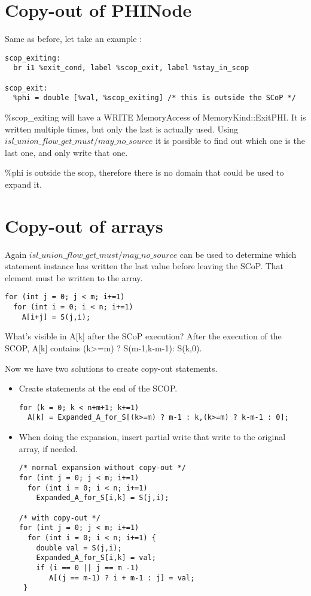 \section{Copy-out of PHINode}
Same as before, let take an example :
\begin{lstlisting}[frame=single]
scop_exiting:
  br i1 %exit_cond, label %scop_exit, label %stay_in_scop

scop_exit:
  %phi = double [%val, %scop_exiting] /* this is outside the SCoP */
\end{lstlisting}

\%scop\_exiting will have a WRITE MemoryAccess of MemoryKind::ExitPHI. It is written multiple times, but only the last is actually used. Using $isl\_union\_flow\_get\_{must/may}\_no\_source$ it is possible to find out which one is the last one, and only write that one.

\%phi is outside the scop, therefore there is no domain that could be used to expand it.

\section{Copy-out of arrays}

Again $isl\_union\_flow\_get\_{must/may}\_no\_source$ can be used to determine which statement instance has written the last value before leaving the SCoP. That element must be written to the array.

\begin{lstlisting}[frame=single]
for (int j = 0; j < m; i+=1)
  for (int i = 0; i < n; i+=1)
    A[i+j] = S(j,i);
\end{lstlisting}

What's visible in A[k] after the SCoP execution? After the execution of the SCOP, A[k] contains (k>=m) ? S(m-1,k-m-1): S(k,0).

Now we have two solutions to create copy-out statements.
\begin{itemize}
\item Create statements at the end of the SCOP.
\begin{lstlisting}[frame=single]
for (k = 0; k < n+m+1; k+=1)
  A[k] = Expanded_A_for_S[(k>=m) ? m-1 : k,(k>=m) ? k-m-1 : 0];
\end{lstlisting}

\item When doing the expansion, insert partial write that write to the original array, if needed.
\begin{lstlisting}[frame=single]
/* normal expansion without copy-out */
for (int j = 0; j < m; i+=1)
  for (int i = 0; i < n; i+=1)
    Expanded_A_for_S[i,k] = S(j,i);

/* with copy-out */
for (int j = 0; j < m; i+=1)
  for (int i = 0; i < n; i+=1) {
    double val = S(j,i); 
    Expanded_A_for_S[i,k] = val;
    if (i == 0 || j == m -1) 
       A[(j == m-1) ? i + m-1 : j] = val; 
 }
\end{lstlisting}
\end{itemize}



